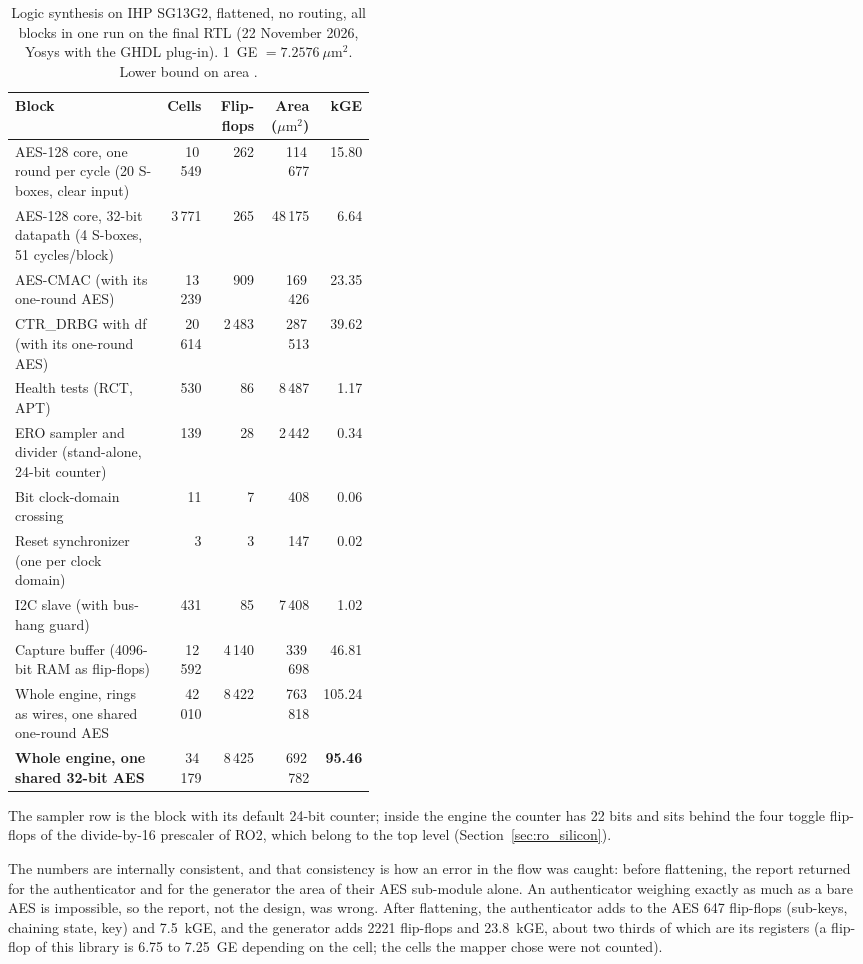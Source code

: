 \begin{table}[htbp]
\centering
\caption{Logic synthesis on IHP SG13G2, flattened, no routing, all
blocks in one run on the final \ac{RTL} (22 November 2026, Yosys with
the GHDL plug-in). 1~GE $=7.2576~\mu\mathrm{m}^2$. Lower bound on area
\simu{}.}
\label{tab:synth}
\begin{tabular}{@{}>{\raggedright\arraybackslash}p{0.42\linewidth}rrrr@{}}
\toprule
Block & Cells & Flip-flops & Area ($\mu\mathrm{m}^2$) & kGE \\
\midrule
AES-128 core, one round per cycle (20 S-boxes, clear input) & 10\,549 & 262 & 114\,677 & 15.80 \\
AES-128 core, 32-bit datapath (4 S-boxes, 51 cycles/block) & 3\,771 & 265 & 48\,175 & 6.64 \\
AES-CMAC (with its one-round AES) & 13\,239 & 909   & 169\,426 & 23.35 \\
CTR\_DRBG with df (with its one-round AES) & 20\,614 & 2\,483 & 287\,513 & 39.62 \\
Health tests (RCT, APT)        & 530     & 86    & 8\,487   & 1.17 \\
ERO sampler and divider (stand-alone, 24-bit counter) & 139 & 28 & 2\,442 & 0.34 \\
Bit clock-domain crossing      & 11      & 7     & 408      & 0.06 \\
Reset synchronizer (one per clock domain) & 3 & 3 & 147      & 0.02 \\
I2C slave (with bus-hang guard) & 431    & 85    & 7\,408   & 1.02 \\
\midrule
Capture buffer (4096-bit RAM as flip-flops) & 12\,592 & 4\,140 & 339\,698 & 46.81 \\
Whole engine, rings as wires, one shared one-round AES & 42\,010 & 8\,422 & 763\,818 & 105.24 \\
\textbf{Whole engine, one shared 32-bit AES} & 34\,179 & 8\,425 & 692\,782 & \textbf{95.46} \\
\bottomrule
\end{tabular}
\end{table}

The sampler row is the block with its default 24-bit counter; inside the
engine the counter has 22 bits and sits behind the four toggle flip-flops
of the divide-by-16 prescaler of RO2, which belong to the top level
(Section~\ref{sec:ro_silicon}).

The numbers are internally consistent, and that consistency is how an
error in the flow was caught: before flattening, the report returned for
the authenticator and for the generator the area of their AES
sub-module alone. An authenticator weighing exactly as much as a bare AES
is impossible, so the report, not the design, was wrong. After
flattening, the authenticator adds to the AES 647 flip-flops (sub-keys,
chaining state, key) and 7.5~kGE, and the generator adds 2221 flip-flops
and 23.8~kGE, about two thirds of which are its registers \est{} (a
flip-flop of this library is 6.75 to 7.25~GE depending on the cell; the
cells the mapper chose were not counted).

